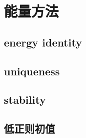 \section{能量方法}
\label{b2:sec:0903}


\subsection{energy identity}
\label{b2:subsec:090301}

\subsection{uniqueness}
\label{b2:subsec:090302}

\subsection{stability}
\label{b2:subsec:090303}

\subsection{低正则初值}
\label{b2:subsec:090304}


